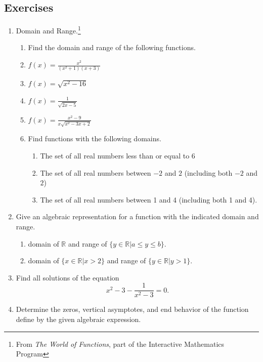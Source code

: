 \documentclass[
]{book}
\providecommand{\tightlist}{%
  \setlength{\itemsep}{0pt}\setlength{\parskip}{0pt}}
\theoremstyle{definition}
\theoremstyle{definition}
\theoremstyle{definition}
\theoremstyle{remark}
\begin{document}
\hypertarget{exercises-35}{%
\subsection{Exercises}\label{exercises-35}}

\begin{enumerate}
\def\labelenumi{\arabic{enumi}.}
\item
  Domain and Range.\footnote{From \emph{The World of Functions}, part of the Interactive Mathematics Program}

  \begin{enumerate}
  \def\labelenumii{\alph{enumii}.}
  \tightlist
  \item
    Find the domain and range of the following functions.
  \item
    \(\displaystyle{ f(x) =\frac{x^2}{(x^2+1)(x+3)}}\)
  \item
    \(\displaystyle{f(x)=\sqrt{x^2-16}}\)
  \item
    \(\displaystyle{f(x)=\frac{1}{\sqrt{2x-5}}}\)
  \item
    \(\displaystyle{f(x)= \frac{x^2-9}{x\sqrt{x^2-3x+2}}}\)
  \item
    Find functions with the following domains.

    \begin{enumerate}
    \def\labelenumiii{\arabic{enumiii}.}
    \tightlist
    \item
      The set of all real numbers less than or equal to 6
    \item
      The set of all real numbers between \(-2\) and \(2\) (including both \(-2\) and \(2\))
    \item
      The set of all real numbers between 1 and 4 (including both 1 and 4).
    \end{enumerate}
  \end{enumerate}
\item
  Give an algebraic representation for a function with the indicated domain and range.

  \begin{enumerate}
  \def\labelenumii{\alph{enumii}.}
  \tightlist
  \item
    domain of \(\mathbb{R}\) and range of \(\{y\in \mathbb{R}\vert a\leq y \leq b\}\).
  \item
    domain of \(\{x\in \mathbb{R}\vert x>2\}\) and range of \(\{y\in \mathbb{R}\vert y>1\}\).
  \end{enumerate}
\item
  Find all solutions of the equation
  \[x^2-3 - \frac{1}{x^2-3} = 0.\]
\item
  Determine the zeros, vertical asymptotes, and end behavior of the function define by the given algebraic expression.


\end{enumerate}
\end{document}
